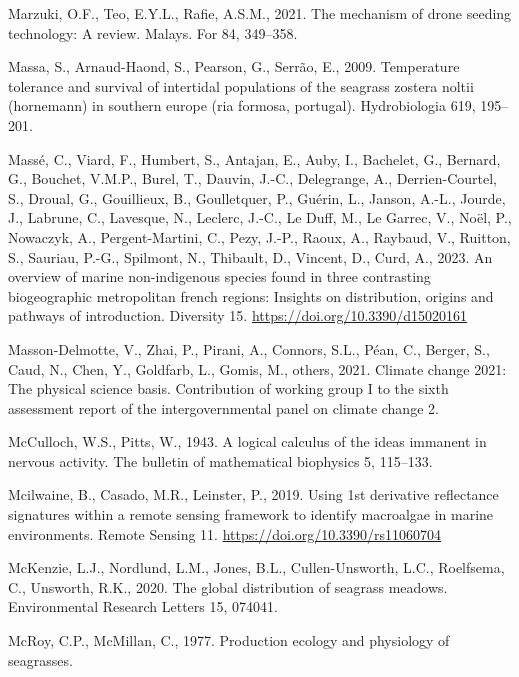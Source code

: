 \documentclass[
  letterpaper,
  11pt,
  english,
  singlespacing,
  headsepline]{MastersDoctoralThesis}
\newlength{\cslhangindent}
\newenvironment{CSLReferences}[2] %
 {\begin{list}{}{%
  \setlength{\itemindent}{0pt}
  \setlength{\leftmargin}{0pt}
  \setlength{\parsep}{0pt}
  \ifodd #1
   \setlength{\leftmargin}{\cslhangindent}
   \setlength{\itemindent}{-1\cslhangindent}
  \fi
  \setlength{\itemsep}{#2\baselineskip}}}
 {\end{list}}
\begin{document}
\begin{CSLReferences}{1}{0}
Marzuki, O.F., Teo, E.Y.L., Rafie, A.S.M., 2021. The mechanism of drone
seeding technology: A review. Malays. For 84, 349--358.

Massa, S., Arnaud-Haond, S., Pearson, G., Serrão, E., 2009. Temperature
tolerance and survival of intertidal populations of the seagrass zostera
noltii (hornemann) in southern europe (ria formosa, portugal).
Hydrobiologia 619, 195--201.

Massé, C., Viard, F., Humbert, S., Antajan, E., Auby, I., Bachelet, G.,
Bernard, G., Bouchet, V.M.P., Burel, T., Dauvin, J.-C., Delegrange, A.,
Derrien-Courtel, S., Droual, G., Gouillieux, B., Goulletquer, P.,
Guérin, L., Janson, A.-L., Jourde, J., Labrune, C., Lavesque, N.,
Leclerc, J.-C., Le Duff, M., Le Garrec, V., Noël, P., Nowaczyk, A.,
Pergent-Martini, C., Pezy, J.-P., Raoux, A., Raybaud, V., Ruitton, S.,
Sauriau, P.-G., Spilmont, N., Thibault, D., Vincent, D., Curd, A., 2023.
An overview of marine non-indigenous species found in three contrasting
biogeographic metropolitan french regions: Insights on distribution,
origins and pathways of introduction. Diversity 15.
\url{https://doi.org/10.3390/d15020161}

Masson-Delmotte, V., Zhai, P., Pirani, A., Connors, S.L., Péan, C.,
Berger, S., Caud, N., Chen, Y., Goldfarb, L., Gomis, M., others, 2021.
Climate change 2021: The physical science basis. Contribution of working
group I to the sixth assessment report of the intergovernmental panel on
climate change 2.

McCulloch, W.S., Pitts, W., 1943. A logical calculus of the ideas
immanent in nervous activity. The bulletin of mathematical biophysics 5,
115--133.

Mcilwaine, B., Casado, M.R., Leinster, P., 2019. Using 1st derivative
reflectance signatures within a remote sensing framework to identify
macroalgae in marine environments. Remote Sensing 11.
\url{https://doi.org/10.3390/rs11060704}

McKenzie, L.J., Nordlund, L.M., Jones, B.L., Cullen-Unsworth, L.C.,
Roelfsema, C., Unsworth, R.K., 2020. The global distribution of seagrass
meadows. Environmental Research Letters 15, 074041.

McRoy, C.P., McMillan, C., 1977. Production ecology and physiology of
seagrasses.


\end{CSLReferences}
\end{document}
